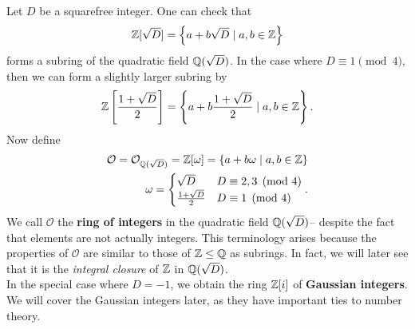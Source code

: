 \documentclass{memoir}
\begin{document}
Let \(D\) be a squarefree integer. One can check that
\begin{align*}
	\mathbb{Z}[\sqrt{D} ] = \left\{a + b\sqrt{D}  \mid a,b \in \mathbb{Z} \right\} 
\end{align*}
forms a subring of the quadratic field \(\mathbb{Q}(\sqrt{D} )\). In the case where \(D \equiv 1 \pmod{4}\), then we can form a slightly larger subring by
\begin{align*}
	\mathbb{Z}\left[ \frac{1+\sqrt{D}}{2} \right] = \left\{ a + b \frac{1+\sqrt{D} }{2} \mid a,b \in \mathbb{Z} \right\} .
\end{align*}
Now define
\begin{align*}
	\mathcal{O} = \mathcal{O}_{\mathbb{Q}(\sqrt{D} )} = \mathbb{Z}[\omega ] = \left\{a + b \omega  \mid a,b \in \mathbb{Z} \right\} \\
	\omega = \begin{cases}
		\sqrt{D}  & D \equiv 2, 3 \pmod{4}\\
		\frac{1+\sqrt{D} }{2} & D \equiv 1 \pmod{4}
	\end{cases}.
\end{align*}
We call \(\mathcal{O}\) the \textbf{ring of integers} in the quadratic field \(\mathbb{Q}(\sqrt{D} )\)-- despite the fact that elements are not actually integers. This terminology arises because the properties of \(\mathcal{O}\) are similar to those of \(\mathbb{Z}\leq \mathbb{Q}\) as subrings. In fact, we will later see that it is the \textit{integral closure} of \(\mathbb{Z}\) in \(\mathbb{Q}(\sqrt{D} )\).\\

In the special case where \(D = -1\), we obtain the ring \(\mathbb{Z}[i]\) of \textbf{Gaussian integers}. We will cover the Gaussian integers later, as they have important ties to number theory.
\end{document}
